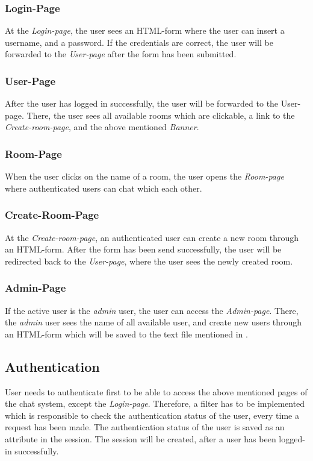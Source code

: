 \subsubsection{Login-Page}\label{subsubsec:02_design_routes_login}
At the \textit{Login-page}, the user sees an HTML-form where the user can insert a username, and a password. If the credentials are correct, the user will be forwarded to the \textit{User-page} after the form has been submitted.

\subsubsection{User-Page}\label{subsubsec:02_design_routes_userpage}
After the user has logged in successfully, the user will be forwarded to the User-page. There, the user sees all available rooms which are clickable, a link to the \textit{Create-room-page}, and the above mentioned \textit{Banner}.

\subsubsection{Room-Page}\label{subsubsec:02_design_routes_room}
When the user clicks on the name of a room, the user opens the \textit{Room-page} where authenticated users can chat which each other.

\subsubsection{Create-Room-Page}\label{subsubsec:02_design_routes_createroom}
At the \textit{Create-room-page}, an authenticated user can create a new room through an HTML-form. After the form has been send successfully, the user will be redirected back to the \textit{User-page}, where the user sees the newly created room.

\subsubsection{Admin-Page}\label{subsubsec:02_design_routes_admin}
If the active user is the \textit{admin} user, the user can access the \textit{Admin-page}. There, the \textit{admin} user sees the name of all available user, and create new users through an HTML-form which will be saved to the text file mentioned in .


\subsection{Authentication}\label{subsec:02_design_authentication}
User needs to authenticate first to be able to access the above mentioned pages of the chat system, except the \textit{Login-page}. Therefore, a filter has to be implemented which is responsible to check the authentication status of the user, every time a request has been made.
The authentication status of the user is saved as an attribute in the session. The session will be created, after a user has been logged-in successfully.


